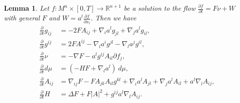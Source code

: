 \documentclass[10pt,a4paper]{amsart}
\newtheorem{lemma}{Lemma}
\begin{document}
\begin{lemma} \label{L1}
Let $f: M^n\times [0, T] \rightarrow \mathbb{R}^{n+1}$ be a solution to the flow $ \frac{\partial f}{\partial t}=F \nu+W$ with general $F$ and $W= a^l\frac {\partial f}{\partial x_l }$. Then we have
\begin{align}
\label{L21}\frac{\partial}{\partial t} g_{ij} &= -2F A_{ij}+\nabla_i a^l g_{jl}+\nabla_j a^lg_{il} \mbox{,}\\
\label{L22}\frac{\partial}{\partial t} g^{ij} &= 2F A^{ij}-\nabla_l a^i g^{jl}-\nabla_l a^jg^{il} \mbox{,}\\
\label{L23}\frac{\partial}{\partial t} \nu &=-\nabla F-a^l g^{ij}A_{il}\partial f_j \mbox{,}\\
\label{L24}\frac{\partial}{\partial t} d \mu &= (-HF+\nabla_l a^l)~d\mu  \mbox{,}\\
\label{L25}\frac{\partial}{\partial t} A_{ij}&= \nabla_{ij}F-F A_{jk}A_{il}g^{kl}+
\nabla_i a^lA_{jl}+\nabla_j a^lA_{il}+a^l\nabla_l A_{ij} \mbox{,}\\
\label{L26}\frac{\partial }{\partial t}H&=\Delta F +F \vert A\vert ^2+g^{ij}a^l\nabla_l A_{ij}.
\end{align}
\end{lemma}
\end{document}
